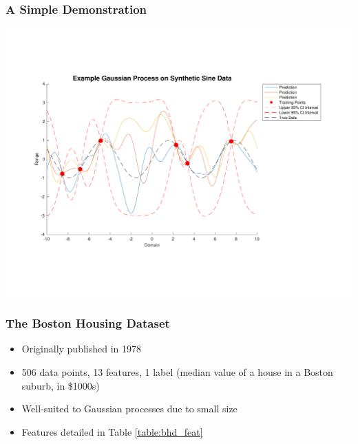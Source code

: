 \documentclass[pdf]{beamer}
\begin{document}
\begin{frame}
  \frametitle{A Simple Demonstration}
  \vspace*{-1cm}
  \hspace*{-2cm} \includegraphics[scale=0.5]{synthetic_data}
\end{frame}

\begin{frame}
  \frametitle{The Boston Housing Dataset}
  \begin{itemize}
    \item Originally published in 1978\cite{harrison_hedonic_1978}
    \item 506 data points, 13 features, 1 label (median value of a house in a Boston suburb, in \$1000s)
    \item Well-suited to Gaussian processes due to small size
    \item Features detailed in Table \ref{table:bhd_feat}
  \end{itemize}
\end{frame}
\end{document}
